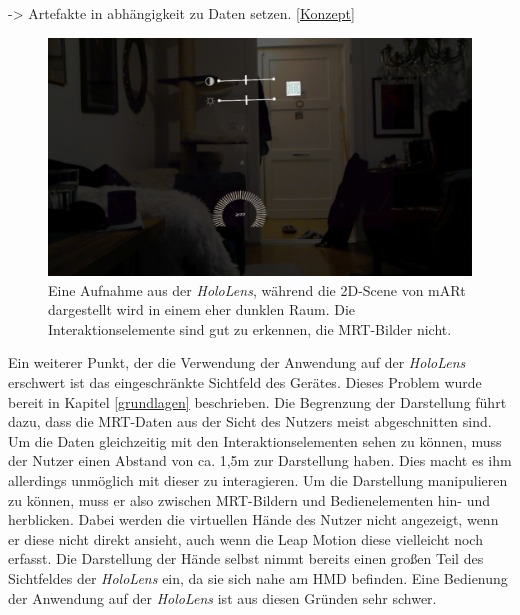 -> Artefakte in abhängigkeit zu Daten setzen. \ref{Konzept}

\begin{figure}[!htb]
	\centering
	\includegraphics[width=0.5\linewidth]{images/hololens2D.jpg}
	\caption{Eine Aufnahme aus der \textit{HoloLens}, während die 2D-Scene von mARt dargestellt wird in einem eher dunklen Raum. Die Interaktionselemente sind gut zu erkennen, die MRT-Bilder nicht.}
	\label{img:ARLicht}
\end{figure}
\FloatBarrier

Ein weiterer Punkt, der die Verwendung der Anwendung auf der \textit{HoloLens} erschwert ist das eingeschränkte Sichtfeld des Gerätes. Dieses Problem wurde bereit in Kapitel \ref{grundlagen} beschrieben. 
Die Begrenzung der Darstellung führt dazu, dass die MRT-Daten aus der Sicht des Nutzers meist abgeschnitten sind. Um die Daten gleichzeitig mit den Interaktionselementen sehen zu können, muss der Nutzer einen Abstand von ca. 1,5m zur Darstellung haben. Dies macht es ihm allerdings unmöglich mit dieser zu interagieren. Um die Darstellung manipulieren zu können, muss er also zwischen MRT-Bildern und Bedienelementen hin- und herblicken. Dabei werden die virtuellen Hände des Nutzer nicht angezeigt, wenn er diese nicht direkt ansieht, auch wenn die Leap Motion diese vielleicht noch erfasst. 
Die Darstellung der Hände selbst nimmt bereits einen großen Teil des Sichtfeldes der \textit{HoloLens} ein, da sie sich nahe am HMD befinden. 
Eine Bedienung der Anwendung auf der \textit{HoloLens} ist aus diesen Gründen sehr schwer. 


